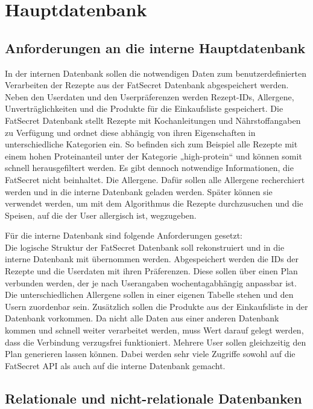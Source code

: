 \section{Hauptdatenbank}
\subsection{Anforderungen an die interne Hauptdatenbank}
In der internen Datenbank sollen die notwendigen Daten zum benutzerdefinierten Verarbeiten der Rezepte aus der FatSecret Datenbank abgespeichert werden. Neben den Userdaten und den Userpräferenzen werden Rezept-IDs, Allergene, Unverträglichkeiten und die Produkte für die Einkaufsliste gespeichert. Die FatSecret Datenbank stellt Rezepte mit Kochanleitungen und Nährstoffangaben zu Verfügung und ordnet diese abhängig von ihren Eigenschaften in unterschiedliche Kategorien ein. So befinden sich zum Beispiel alle Rezepte mit einem hohen Proteinanteil unter der Kategorie „high-protein“ und können somit schnell herausgefiltert werden. Es gibt dennoch notwendige Informationen, die FatSecret nicht beinhaltet. Die Allergene. Dafür sollen alle Allergene recherchiert werden und in die interne Datenbank geladen werden. Später können sie verwendet werden, um mit dem Algorithmus die Rezepte durchzusuchen und die Speisen, auf die der User allergisch ist, wegzugeben.

Für die interne Datenbank sind folgende Anforderungen gesetzt: \\
Die logische Struktur der FatSecret Datenbank soll rekonstruiert und in die interne Datenbank mit übernommen werden. Abgespeichert werden die IDs der Rezepte und die Userdaten mit ihren Präferenzen. Diese sollen über einen Plan verbunden werden, der je nach Userangaben wochentagabhängig anpassbar ist. Die unterschiedlichen Allergene sollen in einer eigenen Tabelle stehen und den Usern zuordenbar sein. Zusätzlich sollen die Produkte aus der Einkaufsliste in der Datenbank vorkommen. Da nicht alle Daten aus einer anderen Datenbank kommen und schnell weiter verarbeitet werden, muss Wert darauf gelegt werden, dass die Verbindung verzugsfrei funktioniert. Mehrere User sollen gleichzeitig den Plan generieren lassen können. Dabei werden sehr viele Zugriffe sowohl auf die FatSecret API als auch auf die interne Datenbank gemacht.

\subsection{Relationale und nicht-relationale Datenbanken}
